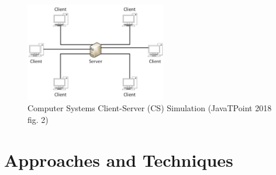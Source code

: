 \begin{figure}[h]
    \centering
    \includegraphics[width=0.55\textwidth]{images/client-server.pdf}
    \captionsetup{justification=centering}
    \caption[Computer Systems Client-Server (CS) Simulation]{Computer Systems Client-Server (CS) Simulation
                                                             (JavaTPoint 2018 fig. 2)}
    \label{fig:network-client-server}
\end{figure}

\section{Approaches and Techniques}

